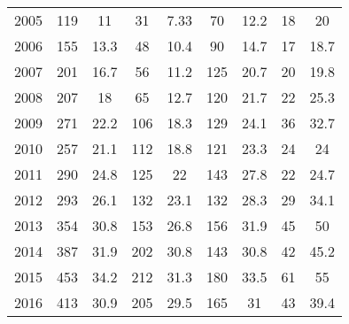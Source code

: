 \begin{table}[htbp]
\begin{tabular}{l*{8}{c}}
2005      &      119&       11&       31&     7.33&       70&     12.2&       18&       20\\
2006      &      155&     13.3&       48&     10.4&       90&     14.7&       17&     18.7\\
2007      &      201&     16.7&       56&     11.2&      125&     20.7&       20&     19.8\\
2008      &      207&       18&       65&     12.7&      120&     21.7&       22&     25.3\\
2009      &      271&     22.2&      106&     18.3&      129&     24.1&       36&     32.7\\
2010      &      257&     21.1&      112&     18.8&      121&     23.3&       24&       24\\
2011      &      290&     24.8&      125&       22&      143&     27.8&       22&     24.7\\
2012      &      293&     26.1&      132&     23.1&      132&     28.3&       29&     34.1\\
2013      &      354&     30.8&      153&     26.8&      156&     31.9&       45&       50\\
2014      &      387&     31.9&      202&     30.8&      143&     30.8&       42&     45.2\\
2015      &      453&     34.2&      212&     31.3&      180&     33.5&       61&       55\\
2016      &      413&     30.9&      205&     29.5&      165&       31&       43&     39.4\\
\hline\hline
\end{tabular}
\end{table}
